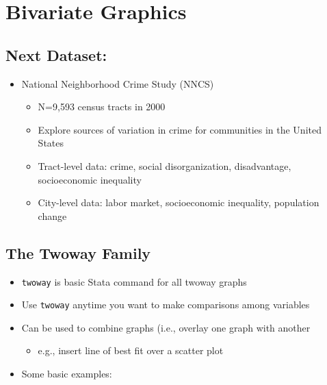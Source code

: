 \documentclass[
]{book}
\providecommand{\tightlist}{%
  \setlength{\itemsep}{0pt}\setlength{\parskip}{0pt}}
\begin{document}
\hypertarget{bivariate-graphics}{%
\section{Bivariate Graphics}\label{bivariate-graphics}}

\hypertarget{next-dataset}{%
\subsection{Next Dataset:}\label{next-dataset}}

\begin{itemize}
\tightlist
\item
  National Neighborhood Crime Study (NNCS)

  \begin{itemize}
  \tightlist
  \item
    N=9,593 census tracts in 2000
  \item
    Explore sources of variation in crime for communities in the United States
  \item
    Tract-level data: crime, social disorganization, disadvantage, socioeconomic inequality
  \item
    City-level data: labor market, socioeconomic inequality, population change
  \end{itemize}
\end{itemize}

\hypertarget{the-twoway-family}{%
\subsection{The Twoway Family}\label{the-twoway-family}}

\begin{itemize}
\tightlist
\item
  \texttt{twoway} is basic Stata command for all twoway graphs
\item
  Use \texttt{twoway} anytime you want to make comparisons among variables
\item
  Can be used to combine graphs (i.e., overlay one graph with another

  \begin{itemize}
  \tightlist
  \item
    e.g., insert line of best fit over a scatter plot
  \end{itemize}
\item
  Some basic examples:
\end{itemize}
\end{document}

